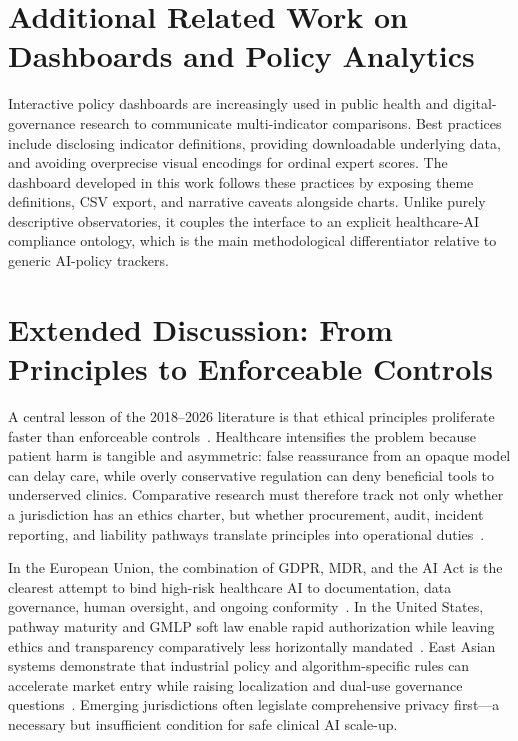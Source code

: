 \section{Additional Related Work on Dashboards and Policy Analytics}
\label{sec:dashlit}

Interactive policy dashboards are increasingly used in public health and digital-governance research to communicate multi-indicator comparisons. Best practices include disclosing indicator definitions, providing downloadable underlying data, and avoiding overprecise visual encodings for ordinal expert scores. The dashboard developed in this work follows these practices by exposing theme definitions, CSV export, and narrative caveats alongside charts. Unlike purely descriptive observatories, it couples the interface to an explicit healthcare-AI compliance ontology, which is the main methodological differentiator relative to generic AI-policy trackers.


\section{Extended Discussion: From Principles to Enforceable Controls}
\label{sec:controls}

A central lesson of the 2018--2026 literature is that ethical principles proliferate faster than enforceable controls~\cite{jobin2019,mittelstadt2019}. Healthcare intensifies the problem because patient harm is tangible and asymmetric: false reassurance from an opaque model can delay care, while overly conservative regulation can deny beneficial tools to underserved clinics. Comparative research must therefore track not only whether a jurisdiction has an ethics charter, but whether procurement, audit, incident reporting, and liability pathways translate principles into operational duties~\cite{morley2020,who2021}.

In the European Union, the combination of GDPR, MDR, and the AI Act is the clearest attempt to bind high-risk healthcare AI to documentation, data governance, human oversight, and ongoing conformity~\cite{euaiact2024,goodman2017}. In the United States, pathway maturity and GMLP soft law enable rapid authorization while leaving ethics and transparency comparatively less horizontally mandated~\cite{fda2021,gmlp2021,wu2021}. East Asian systems demonstrate that industrial policy and algorithm-specific rules can accelerate market entry while raising localization and dual-use governance questions~\cite{nmpa2021,pmda2020}. Emerging jurisdictions often legislate comprehensive privacy first---a necessary but insufficient condition for safe clinical AI scale-up.

